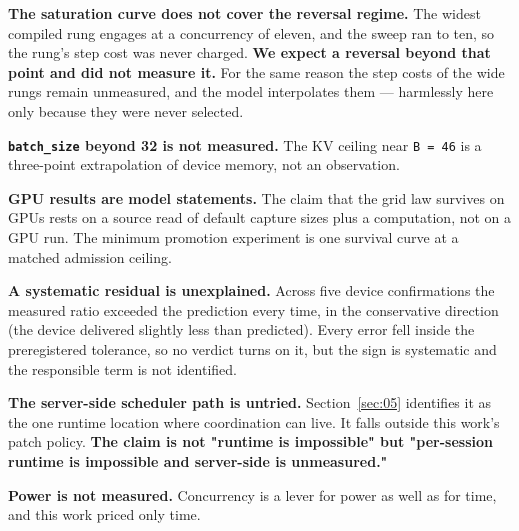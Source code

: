 \textbf{The saturation curve does not cover the reversal regime.} The widest compiled rung engages at a concurrency of eleven, and the sweep ran to ten, so the rung's step cost was never charged. \textbf{We expect a reversal beyond that point and did not measure it.} For the same reason the step costs of the wide rungs remain unmeasured, and the model interpolates them --- harmlessly here only because they were never selected.

\textbf{\texttt{batch\_size} beyond 32 is not measured.} The KV ceiling near \texttt{B = 46} is a three-point extrapolation of device memory, not an observation.

\textbf{GPU results are model statements.} The claim that the grid law survives on GPUs rests on a source read of default capture sizes plus a computation, not on a GPU run. The minimum promotion experiment is one survival curve at a matched admission ceiling.

\textbf{A systematic residual is unexplained.} Across five device confirmations the measured ratio exceeded the prediction every time, in the conservative direction (the device delivered slightly less than predicted). Every error fell inside the preregistered tolerance, so no verdict turns on it, but the sign is systematic and the responsible term is not identified.

\textbf{The server-side scheduler path is untried.} Section~\ref{sec:05} identifies it as the one runtime location where coordination can live. It falls outside this work's patch policy. \textbf{The claim is not "runtime is impossible" but "per-session runtime is impossible and server-side is unmeasured."}

\textbf{Power is not measured.} Concurrency is a lever for power as well as for time, and this work priced only time.
